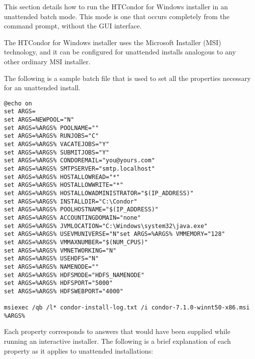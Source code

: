 This section details how to run the HTCondor for Windows installer in an
unattended batch mode.
This mode is one that occurs completely from the command prompt,
without the GUI interface.

The HTCondor for Windows installer uses the Microsoft Installer (MSI)
technology, and it can be configured for unattended installs analogous
to any other ordinary MSI installer.

The following is a sample batch file that is used to set all the
properties necessary for an unattended install.

\begin{verbatim}
@echo on
set ARGS=
set ARGS=NEWPOOL="N"
set ARGS=%ARGS% POOLNAME=""
set ARGS=%ARGS% RUNJOBS="C"
set ARGS=%ARGS% VACATEJOBS="Y"
set ARGS=%ARGS% SUBMITJOBS="Y"
set ARGS=%ARGS% CONDOREMAIL="you@yours.com"
set ARGS=%ARGS% SMTPSERVER="smtp.localhost"
set ARGS=%ARGS% HOSTALLOWREAD="*"
set ARGS=%ARGS% HOSTALLOWWRITE="*"
set ARGS=%ARGS% HOSTALLOWADMINISTRATOR="$(IP_ADDRESS)"
set ARGS=%ARGS% INSTALLDIR="C:\Condor"
set ARGS=%ARGS% POOLHOSTNAME="$(IP_ADDRESS)"
set ARGS=%ARGS% ACCOUNTINGDOMAIN="none"
set ARGS=%ARGS% JVMLOCATION="C:\Windows\system32\java.exe"
set ARGS=%ARGS% USEVMUNIVERSE="N"set ARGS=%ARGS% VMMEMORY="128"
set ARGS=%ARGS% VMMAXNUMBER="$(NUM_CPUS)"
set ARGS=%ARGS% VMNETWORKING="N"
set ARGS=%ARGS% USEHDFS="N"
set ARGS=%ARGS% NAMENODE=""
set ARGS=%ARGS% HDFSMODE="HDFS_NAMENODE"
set ARGS=%ARGS% HDFSPORT="5000"
set ARGS=%ARGS% HDFSWEBPORT="4000"
 
msiexec /qb /l* condor-install-log.txt /i condor-7.1.0-winnt50-x86.msi %ARGS%
\end{verbatim}

Each property corresponds to answers that would have been
supplied while running an interactive installer.
The following is a brief explanation of each property
as it applies to unattended installations:


